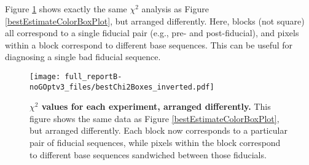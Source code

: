 \documentclass{article}[11pt]
\begin{document}
{Figure \ref{invertedBestEstimateColorBoxPlot} shows exactly the same $\chi^2$ analysis as Figure \ref{bestEstimateColorBoxPlot}, but arranged differently.  Here, blocks (not square) all correspond to a single fiducial pair (e.g., pre- and post-fiducial), and pixels within a block correspond to different base sequences.  This can be useful for diagnosing a single bad fiducial sequence.

\begin{figure}
\begin{center}
\texttt{[image: full\_reportB-noGOptv3\_files/bestChi2Boxes\_inverted.pdf]}
\caption{\textbf{$\chi^2$ values for each experiment, arranged differently.}  This figure shows the same data as Figure \ref{bestEstimateColorBoxPlot}, but arranged differently.  Each block now corresponds to a particular pair of fiducial sequences, while pixels within the block correspond to different base sequences sandwiched between those fiducials.\label{invertedBestEstimateColorBoxPlot}}
\end{center}
\end{figure}

}{}


\end{document}

